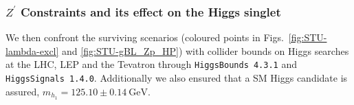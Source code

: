 \documentclass[10pt]{report}
\begin{document}
\subsubsection{$Z^\prime$ Constraints and its effect on the Higgs singlet}


We then confront the surviving scenarios (coloured points in Figs.~\ref{fig:STU-lambda-excl} and \ref{fig:STU-gBL_Zp_HP}) with collider bounds on Higgs searches at the LHC, LEP and the Tevatron through \texttt{HiggsBounds 4.3.1} and \texttt{HiggsSignals 1.4.0}. 
%
Additionally we also ensured that a SM Higgs candidate is assured, $m_{h_1} = 125.10 \pm 0.14~\textrm{GeV}$. 
\end{document}
